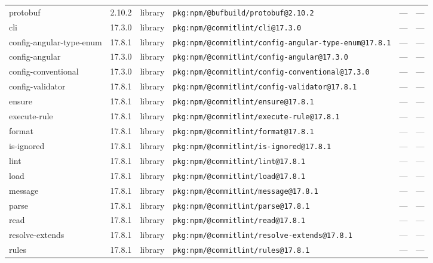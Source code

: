 \documentclass[11pt,a4paper]{article}
\begin{document}
\begin{longtable}{|p{4cm}|p{2cm}|p{1.6cm}|p{5cm}|p{1.5cm}|p{3.5cm}|}
\raggedright protobuf & 2.10.2 & library & \small\texttt{pkg:npm/@bufbuild/protobuf@2.10.2} & — & \small — \\
\raggedright cli & 17.3.0 & library & \small\texttt{pkg:npm/@commitlint/cli@17.3.0} & — & \small — \\
\raggedright config-angular-type-enum & 17.8.1 & library & \small\texttt{pkg:npm/@commitlint/config-angular-type-enum@17.8.1} & — & \small — \\
\raggedright config-angular & 17.3.0 & library & \small\texttt{pkg:npm/@commitlint/config-angular@17.3.0} & — & \small — \\
\raggedright config-conventional & 17.3.0 & library & \small\texttt{pkg:npm/@commitlint/config-conventional@17.3.0} & — & \small — \\
\raggedright config-validator & 17.8.1 & library & \small\texttt{pkg:npm/@commitlint/config-validator@17.8.1} & — & \small — \\
\raggedright ensure & 17.8.1 & library & \small\texttt{pkg:npm/@commitlint/ensure@17.8.1} & — & \small — \\
\raggedright execute-rule & 17.8.1 & library & \small\texttt{pkg:npm/@commitlint/execute-rule@17.8.1} & — & \small — \\
\raggedright format & 17.8.1 & library & \small\texttt{pkg:npm/@commitlint/format@17.8.1} & — & \small — \\
\raggedright is-ignored & 17.8.1 & library & \small\texttt{pkg:npm/@commitlint/is-ignored@17.8.1} & — & \small — \\
\raggedright lint & 17.8.1 & library & \small\texttt{pkg:npm/@commitlint/lint@17.8.1} & — & \small — \\
\raggedright load & 17.8.1 & library & \small\texttt{pkg:npm/@commitlint/load@17.8.1} & — & \small — \\
\raggedright message & 17.8.1 & library & \small\texttt{pkg:npm/@commitlint/message@17.8.1} & — & \small — \\
\raggedright parse & 17.8.1 & library & \small\texttt{pkg:npm/@commitlint/parse@17.8.1} & — & \small — \\
\raggedright read & 17.8.1 & library & \small\texttt{pkg:npm/@commitlint/read@17.8.1} & — & \small — \\
\raggedright resolve-extends & 17.8.1 & library & \small\texttt{pkg:npm/@commitlint/resolve-extends@17.8.1} & — & \small — \\
\raggedright rules & 17.8.1 & library & \small\texttt{pkg:npm/@commitlint/rules@17.8.1} & — & \small — \\

\end{longtable}
\end{document}
